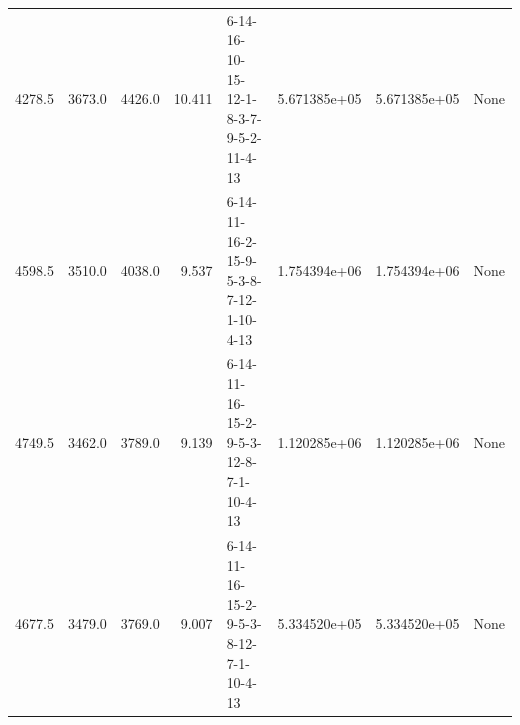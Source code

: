 \begin{tabular}{rrrrlrrl}
 4278.5 &  3673.0 &         4426.0 &             10.411 &  6-14-16-10-15-12-1-8-3-7-9-5-2-11-4-13 &  5.671385e+05 &  5.671385e+05 &   None \\
 4598.5 &  3510.0 &         4038.0 &              9.537 &  6-14-11-16-2-15-9-5-3-8-7-12-1-10-4-13 &  1.754394e+06 &  1.754394e+06 &   None \\
 4749.5 &  3462.0 &         3789.0 &              9.139 &  6-14-11-16-15-2-9-5-3-12-8-7-1-10-4-13 &  1.120285e+06 &  1.120285e+06 &   None \\
 4677.5 &  3479.0 &         3769.0 &              9.007 &  6-14-11-16-15-2-9-5-3-8-12-7-1-10-4-13 &  5.334520e+05 &  5.334520e+05 &   None \\
\bottomrule
\end{tabular}
